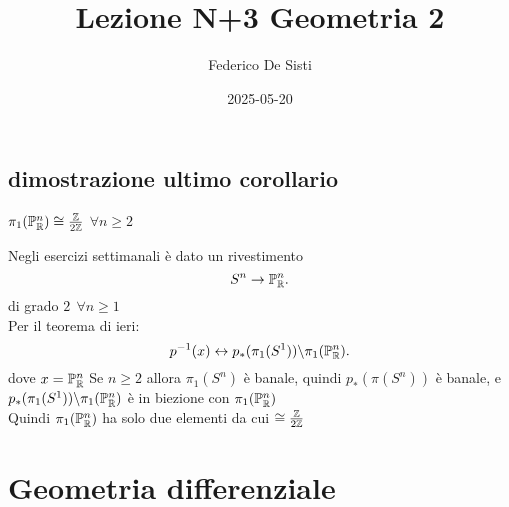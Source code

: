 \documentclass[12px]{article}
\title{Lezione N+3 Geometria 2}
\date{2025-05-20}
\author{Federico De Sisti}
\begin{document}
	\maketitle
	\newpage
	\subsection{dimostrazione ultimo corollario}
	\begin{coro}
		$\pi_1(\mathbb{P}_{\mathbb{R}}^n) \cong \frac{\mathbb{Z}}{2\mathbb{Z}}$ $\forall n\geq 2$
	\end{coro}
	\begin{dimo}
		Negli esercizi settimanali è dato un rivestimento
		\[
		S^n \rightarrow \mathbb{P}_{\mathbb{R}}^n
		.\] 
		di grado $2 \ \ \forall n\geq 1$\\
		Per il teorema di ieri:
		 \[
			 p^{-1}(x) \leftrightarrow p_*(\pi_1(S^1))\backslash \pi_1(\mathbb{P}^n_{\mathbb{R}})
		.\] 
		dove $x =\mathbb{P}^n_{\mathbb{R}}$ Se  $n\geq 2$ allora  $\pi_1(S^n)$ è banale, quindi $p_*(\pi(S^n))$ è banale, e $p_*(\pi_1(S^1))\backslash \pi_1(\mathbb{P}^n_{\mathbb{R}})$ è in biezione con $\pi_1(\mathbb{P}^n_{\mathbb{R}})$\\
		Quindi $\pi_1(\mathbb{P}^n_{\mathbb{R}})$ ha solo due elementi da cui $\cong \frac{\mathbb{Z}}{2\mathbb{Z}}$
	\end{dimo}
	\section{Geometria differenziale}
\end{document}
